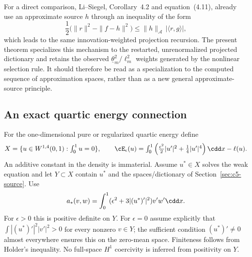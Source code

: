 \documentclass[11pt]{article}
\theoremstyle{remark}
\begin{document}
For a direct comparison, Li--Siegel, Corollary~4.2 and equation~(4.11),
already use an approximate source \(h\) through an inequality of the form
\[
 \frac12\big(\|r\|^2-\|f-h\|^2\big)
 \leq \|h\|_{\mathcal A}\,|\langle r,g\rangle|,
\]
which leads to the same innovation-weighted projection recursion. The
present theorem specializes this mechanism to the restarted, unrenormalized
projected dictionary and retains the observed
\(\underline\theta_m^2/\ell_m^2\) weights generated by the nonlinear selection rule. It
should therefore be read as a specialization to the computed sequence of approximation
spaces, rather than as a new general approximate-source principle.

\subsection{An exact quartic energy connection}
\label{sec:c5-quartic}

For the one-dimensional pure or regularized quartic energy define
\[
 X=\{u\in W^{1,4}(0,1):\textstyle\int_0^1u=0\},\qquad
 \cE_\epsilon(u)=\int_0^1
       \left(\tfrac{\epsilon^2}2|u'|^2+\tfrac14|u'|^4\right)\cdd x-\ell(u).
\]
An additive constant in the density is immaterial.
Assume $u^*\in X$ solves the weak equation and let $Y\subset X$
contain $u^*$ and the spaces/dictionary of
Section~\ref{sec:c5-source}. Use
\[
 a_*(v,w)=\int_0^1(\epsilon^2+3|(u^*)'|^2)v'w'\cdd x .
\]
For $\epsilon>0$ this is positive definite on $Y$.
For $\epsilon=0$ assume explicitly that
$\int |(u^*)'|^2|v'|^2>0$ for every nonzero $v\in Y$;
the sufficient condition $(u^*)'\ne0$ almost everywhere ensures this
on the zero-mean space. Finiteness follows from Holder's inequality.
No full-space $H^1$ coercivity is inferred from positivity on $Y$.
\end{document}
